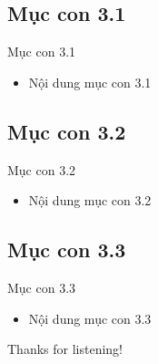 \documentclass{beamer}
\begin{document}
\subsection{Mục con 3.1}
\begin{frame}{Mục con 3.1}
\begin{itemize}
\item Nội dung mục con 3.1
\end{itemize}
\end{frame}

\subsection{Mục con 3.2}
\begin{frame}{Mục con 3.2}
\begin{itemize}
\item Nội dung mục con 3.2
\end{itemize}
\end{frame}

\subsection{Mục con 3.3}
\begin{frame}{Mục con 3.3}
\begin{itemize}
\item Nội dung mục con 3.3
\end{itemize}
\end{frame}

\begin{frame}{}
\centering
\Huge{Thanks for listening!}
\end{frame}
\end{document}
